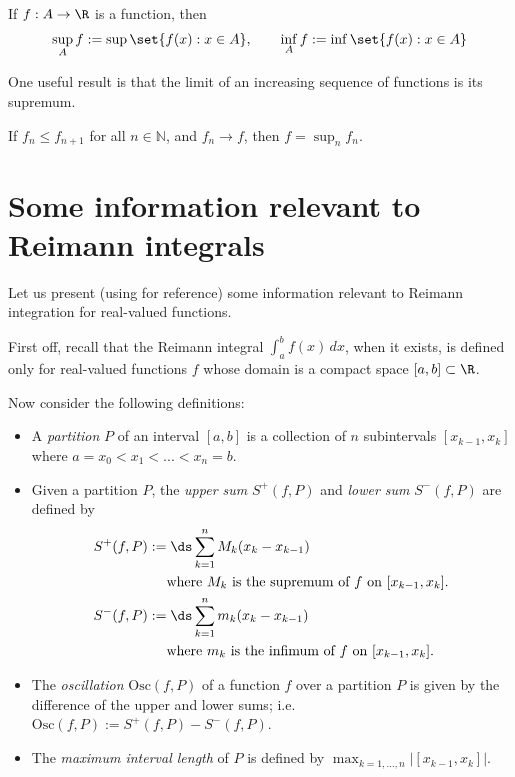 \documentclass{article} %
\begin{document}
\begin{definition}
If $f : A \to \R$ is a function, then 
\[ \sup_A f := \sup \set{f(x) : x \in A}, \quad \quad \inf_A f := \inf \set{f(x) : x \in A} \]	
\end{definition}

One useful result is that the limit of an increasing sequence of functions is its supremum.

\begin{proposition}
If $f_n \leq f_{n+1}$ for all $n \in \mathbb{N}$, and $f_n \to f$, then $f = \sup_n f_n$.
\label{prop:limit_of_an_increasing_sequence_of_functions_is_its_supremum}	
\end{proposition}


\section{Some information relevant to Reimann integrals} \label{sec:some_info_relevant_to_reimann_integrals}

Let us present (using  \cite{strichartz2000way} for reference) some information relevant to Reimann integration for real-valued functions.  

First off, recall that the Reimann integral $\int_{a}^b f(x) \, dx$, when it exists,  is defined only for real-valued functions  $f$ whose domain is a compact space $[a,b] \subset \R$.   

Now consider the following definitions:

\begin{itemize}
\item A \textit{partition} $P$ of an interval $[a,b]$ is a collection of $n$ subintervals $[x_{k-1}, x_k]$ where $a=x_0 < x_1 < ... < x_n = b$. 
\item Given a partition $P$, the \textit{upper sum} $S^+(f,P)$ and \textit{lower sum} $S^-(f,P)$ are defined by 
\begin{align*}
S^+(f,P) &:= \ds\sum_{k=1}^n M_k (x_k - x_{k-1}) \\
&\quad \text{ where $M_k$ is the supremum of $f$ on $[x_{k-1}, x_k]$.} \\	
S^-(f,P) &:= \ds\sum_{k=1}^n m_k (x_k - x_{k-1}) \\
&\quad \text{ where $m_k$ is the infimum of $f$ on $[x_{k-1}, x_k]$.} \\
\end{align*}
\item The \textit{oscillation} $\text{Osc}(f,P)$ of a function $f$ over a partition $P$ is given by the difference of the upper and lower sums; i.e. $ \text{Osc}(f,P) := S^+(f,P) - S^-(f,P)$.
\item The \textit{maximum interval length} of $P$ is defined by $ \max_{k=1,...,n} \big|[x_{k-1}, x_k]\big|$.
\end{itemize}
\end{document}
